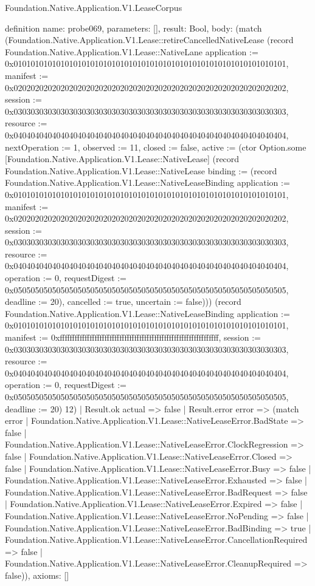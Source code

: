 \begin{lexlean}{Foundation.Native.Application.V1.LeaseCorpus}
\begin{semanticmodule}
definition{
  name: probe069,
  parameters: [],
  result: Bool,
  body: (match (Foundation.Native.Application.V1.Lease::retireCancelledNativeLease (record Foundation.Native.Application.V1.Lease::NativeLane {application := 0x0101010101010101010101010101010101010101010101010101010101010101, manifest := 0x0202020202020202020202020202020202020202020202020202020202020202, session := 0x0303030303030303030303030303030303030303030303030303030303030303, resource := 0x0404040404040404040404040404040404040404040404040404040404040404, nextOperation := 1, observed := 11, closed := false, active := (ctor Option.some [Foundation.Native.Application.V1.Lease::NativeLease] (record Foundation.Native.Application.V1.Lease::NativeLease {binding := (record Foundation.Native.Application.V1.Lease::NativeLeaseBinding {application := 0x0101010101010101010101010101010101010101010101010101010101010101, manifest := 0x0202020202020202020202020202020202020202020202020202020202020202, session := 0x0303030303030303030303030303030303030303030303030303030303030303, resource := 0x0404040404040404040404040404040404040404040404040404040404040404, operation := 0, requestDigest := 0x0505050505050505050505050505050505050505050505050505050505050505, deadline := 20}), cancelled := true, uncertain := false}))}) (record Foundation.Native.Application.V1.Lease::NativeLeaseBinding {application := 0x0101010101010101010101010101010101010101010101010101010101010101, manifest := 0xffffffffffffffffffffffffffffffffffffffffffffffffffffffffffffffff, session := 0x0303030303030303030303030303030303030303030303030303030303030303, resource := 0x0404040404040404040404040404040404040404040404040404040404040404, operation := 0, requestDigest := 0x0505050505050505050505050505050505050505050505050505050505050505, deadline := 20}) 12)
    | Result.ok actual => false
    | Result.error error => (match error
      | Foundation.Native.Application.V1.Lease::NativeLeaseError.BadState => false
      | Foundation.Native.Application.V1.Lease::NativeLeaseError.ClockRegression => false
      | Foundation.Native.Application.V1.Lease::NativeLeaseError.Closed => false
      | Foundation.Native.Application.V1.Lease::NativeLeaseError.Busy => false
      | Foundation.Native.Application.V1.Lease::NativeLeaseError.Exhausted => false
      | Foundation.Native.Application.V1.Lease::NativeLeaseError.BadRequest => false
      | Foundation.Native.Application.V1.Lease::NativeLeaseError.Expired => false
      | Foundation.Native.Application.V1.Lease::NativeLeaseError.NoPending => false
      | Foundation.Native.Application.V1.Lease::NativeLeaseError.BadBinding => true
      | Foundation.Native.Application.V1.Lease::NativeLeaseError.CancellationRequired => false
      | Foundation.Native.Application.V1.Lease::NativeLeaseError.CleanupRequired => false)),
  axioms: []
}


\end{semanticmodule}
\end{lexlean}
